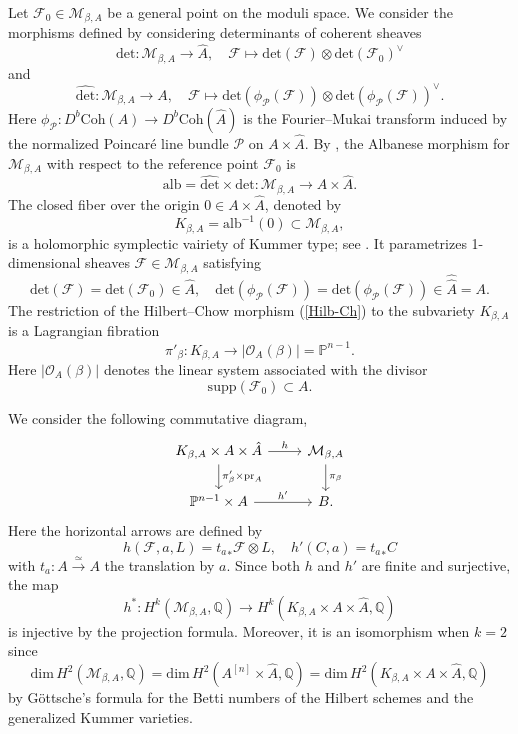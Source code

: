 \documentclass[11pt]{amsart}
\theoremstyle{plain}
\theoremstyle{definition}
\theoremstyle{remark}
\newcommand{\BP}{{\mathbb{P}}}
\newcommand{\BQ}{{\mathbb{Q}}}
\newcommand{\CF}{{\mathcal F}}
\newcommand{\CM}{{\mathcal M}}
\newcommand{\CO}{{\mathcal O}}
\newcommand{\CP}{{\mathcal P}}
\newcommand{\Coh}{\mathrm{Coh}}
\begin{document}
Let $\CF_0 \in \CM_{\beta, A}$ be a general point on the moduli space. We consider the  morphisms
defined by considering determinants of coherent sheaves
\[
\mathrm{det}: \CM_{\beta,A} \to \hat{A}, \quad \CF \mapsto \mathrm{det}(\CF)\otimes \mathrm{det}(\CF_0)^\vee 
\]
and
\[
\hat{\mathrm{det}}: \CM_{\beta,A} \to A, \quad \CF \mapsto \mathrm{det}(\phi_\CP(\CF)) \otimes \mathrm{det}(\phi_\CP(\CF))^\vee.
\]
Here $\phi_\CP : D^b\Coh(A) \to D^b\Coh(\hat{A})$ is the Fourier--Mukai transform induced by the normalized Poincar\'e line bundle $\CP$ on $A \times \hat{A}$. By \cite[(4.1) and Theorem 4.1]{Yo}, the Albanese morphism for $\CM_{\beta,A}$ with respect to the reference point $\CF_0$ is
\[
\mathrm{alb} = \hat{\mathrm{det}} \times \mathrm{det}: \CM_{\beta,A} \to A \times \hat{A}.
\]
The closed fiber over the origin $0 \in A\times \hat{A}$, denoted by
\[
K_{\beta,A} = \mathrm{alb}^{-1}(0) \subset \CM_{\beta, A},
\]
is a holomorphic symplectic vairiety of Kummer type; see \cite[Theorem 0.2]{Yo}. It parametrizes 1-dimensional sheaves $\CF \in \CM_{\beta,A}$ satisfying
\[
 \mathrm{det}(\CF)= \mathrm{det}(\CF_0) \in \hat{A},\quad   \mathrm{det}(\phi_\CP(\CF)) = \mathrm{det}(\phi_\CP(\CF)) \in \hat{\hat{A}} = A.
\]
The restriction of the Hilbert--Chow morphism (\ref{Hilb-Ch}) to the subvariety $K_{\beta, A}$ is a Lagrangian fibration
\[
\pi'_\beta: K_{\beta, A} \to  |\CO_A(\beta)| =  \BP^{n-1}.
\]
Here $ |\CO_A(\beta)|$ denotes the linear system associated with the divisor  
\[
\mathrm{supp}(\CF_0) \subset A.
\]

We consider the following commutative diagram,
\begin{equation}\label{diagram1}
    \begin{tikzcd}
K_{\beta, A} \times A \times \hat{A}\arrow{r}{h} \arrow{d}{\pi'_\beta \times \mathrm{pr}_A} & \CM_{\beta,A}\arrow{d}{\pi_\beta} \\
 \BP^{n-1}\times A \arrow{r}{h'} & B.
\end{tikzcd} 
\end{equation}
Here the horizontal arrows are defined by
\[
h(\CF, a, L) = {t_a}_* \CF \otimes  L,\quad h'(C, a)= {t_a}_\ast C
\]
with $t_a: A \xrightarrow{\simeq} A$ the translation by $a$. Since both $h$ and $h'$ are finite and surjective, the map
\begin{equation*}
    h^*: H^k(\CM_{\beta, A}, \BQ) \to H^k(K_{\beta, A} \times A \times \hat{A}, \BQ)
\end{equation*}
is injective by the projection formula. Moreover, it is an isomorphism when $k=2$ since
\[
\mathrm{dim}\,H^2(\CM_{\beta,A}, \BQ) = \mathrm{dim}\,H^2(A^{[n]}\times \hat{A}, \BQ)= \mathrm{dim}\,H^2(K_{\beta, A} \times A \times \hat{A}, \BQ)
\]
by G\"ottsche's formula \cite{Go1} for the Betti numbers of the Hilbert schemes and the generalized Kummer varieties.
\end{document}
